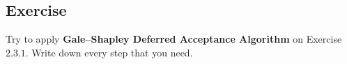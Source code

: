 \subsection{Exercise}
Try to apply \textbf{Gale–Shapley Deferred Acceptance Algorithm} on Exercise $2.3.1$. Write down every step that you need.






























